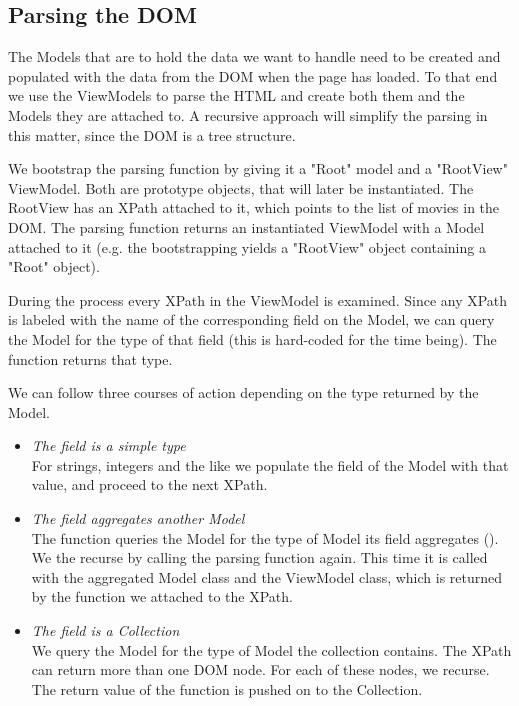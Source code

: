 \documentclass[thesis.tex]{subfiles}
\begin{document}
\subsection{Parsing the DOM}

The Models that are to hold the data we want to handle need to be created and
populated with the data from the DOM when the page has loaded.
To that end we use the ViewModels to parse the HTML and create both them and
the Models they are attached to.
A recursive approach will simplify the parsing in this matter, since the DOM
is a tree structure.

We bootstrap the parsing function by giving it a "Root" model and a "RootView"
ViewModel. Both are prototype objects, that will later be instantiated.
The RootView has an XPath attached to it, which points to the list of movies
in the DOM. The parsing function returns an instantiated ViewModel with a Model
attached to it (e.g. the bootstrapping yields a "RootView" object containing
a "Root" object).

During the process every XPath in the ViewModel is examined.
Since any XPath is labeled with the name of the corresponding field on the
Model, we can query the Model for the type of that field
(this is hard-coded for the time being). The function 
returns that type.

We can follow three courses of action depending on the type
returned by the Model.
\begin{itemize}
	\item \emph{The field is a simple type}\\
	For strings, integers and the like we populate the field of the Model
	with that value, and proceed to the next XPath.
	\item \emph{The field aggregates another Model}\\
	The function queries the Model for the type of Model its field aggregates
	().
	We the recurse by calling the parsing function again.
	This time it is called with the aggregated Model class and
	the ViewModel class, which is returned by the  function
	we attached to the XPath.
	\item \emph{The field is a Collection}\\
	We query the Model for the type of Model the collection contains.
	The XPath can return more than one DOM node.
	For each of these nodes, we recurse.
	The return value of the function is pushed on to the Collection.
\end{itemize}
\end{document}
